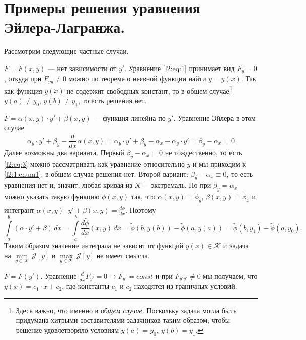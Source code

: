 \documentclass[12pt,a4paper,openany,fleqn]{book}
\newcommand{\J}{\ensuremath{\mathcal{J}}}
\newcommand{\mc}[1]{\ensuremath{\mathcal{#1}}}
\newcommand{\der}[2]{\ensuremath{\frac{d#1}{d#2}}}
\newcommand{\K}{\mc{K}}
\theoremstyle{definition}
\begin{document}
	\section{Примеры решения уравнения Эйлера-Лагранжа.}
	\label{lecture2section1}
	Рассмотрим следующие частные случаи.
	\begin{enumerate1}
		\item \label{l2:1:enum1} $F=F(x,y)$ --- нет зависимости от $y'$. Уравнение \eqref{l2:eq:1} принимает вид $F_y=0$, откуда при $F_{yy}\neq0$ можно по теореме о неявной функции найти $y=y(x)$. Так как функция $y(x)$ не содержит свободных констант, то в общем случае\footnote[1]{Здесь важно, что именно в \emph{общем случае}. Поскольку задача могла быть придумана хитрыми составителями задачников таким образом, чтобы решение удовлетворяло условиям $y(a)=y_0,\  y(b)=y_1$.} $y(a)\neq y_0$, $y(b)\neq y_1$, то есть решения нет. 
		
		\item  $F=\alpha(x,y)\cdot y'+\beta(x,y)$ --- функция линейна по $y'$. Уравнение Эйлера в этом случае
		\begin{equation}
			\label{l2:eq:3}
			\alpha_y\cdot y'+\beta_y-\der{}{x}\alpha(x,y)=\underline{\alpha_y\cdot y'}+\beta_y-\alpha_x-\underline{\alpha_y\cdot y'}=\beta_y-\alpha_x=0
		\end{equation}
		Далее возможны два варианта. Первый $\beta_y-\alpha_x=0$ не тождественно, то есть \eqref{l2:eq:3} можно рассматривать как уравнение относительно $y$ и мы приходим к \ref{l2:1:enum1}: в общем случае решения нет. 
		\noindent Второй вариант: $\beta_y-\alpha_x\equiv0$, то есть уравнения нет и, значит, любая кривая из \K --- экстремаль. Но при $\beta_y=\alpha_x$ можно указать такую функцию $\widetilde{\phi}(x,y)$ так, что $\alpha(x,y)=\widetilde{\phi}_y$, $\beta(x,y)=\widetilde{\phi}_x$ и интегрант $\alpha(x,y)\cdot y'+\beta(x,y)=\displaystyle\der{\widetilde{\phi}}{x}$. Поэтому 
		\begin{equation*}
			\int\limits_a^b(\alpha\cdot y'+\beta)\,dx=\int\limits_a^b\der{\widetilde{\phi}}{x}(x,y)\,dx=\widetilde{\phi}(b,y(b))-\widetilde{\phi}(a,y(a))=\widetilde{\phi}(b,y_1)-\widetilde{\phi}(a,y_0).
		\end{equation*}
		Таким образом значение интеграла не зависит от функций $y(x)\in\K$ и задача на $\min\limits_{y\in\K}\,\J[y]$ и $\max\limits_{y\in\K}\,\J[y]$ не имеет смысла.
		
		\item $F=F(y')$. Уравнение $\der{}{x}F_{y'}=0\rightarrow F_{y'}=const$ и при $F_{y'y'}\neq0$ мы получаем, что $y(x)=c_1\cdot x+c_2$, где константы $c_1$ и $c_2$ находятся из граничных условий.
		

\end{enumerate1}
\end{document}
